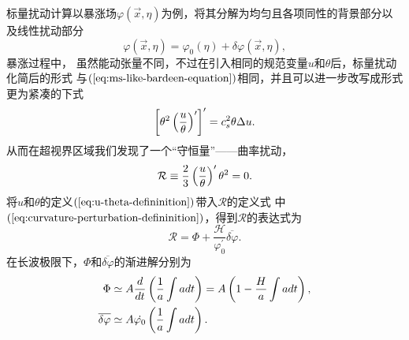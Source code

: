 标量扰动计算以暴涨场$\varphi(\vec{x},\eta)$为例，将其分解为均匀且各项同性的背景部分以及线性扰动部分
\begin{equation}
  \varphi(\vec{x},\eta)=\varphi_{0}(\eta)+\delta\varphi(\vec{x},\eta), 
\end{equation}
暴涨过程中，
虽然能动张量不同，不过在引入相同的规范变量$u$和$\theta$后，标量扰动化简后的形式
与$(\ref{eq:ms-like-bardeen-equation})$相同，并且可以进一步改写成形式更为紧凑的下式
\begin{equation}
  \left[\theta^2\left(\frac{u}{\theta}\right)^{\prime}\right]^{\prime} =
  c_{s}^2\theta\Delta u.
\end{equation}
从而在超视界区域我们发现了一个“守恒量”——曲率扰动，
\begin{equation}
  \label{eq:curvature-perturbation-defininition}
  \mathcal{R}\equiv \frac{2}{3}\left(\frac{u}{\theta}\right)^{\prime}\theta^2 = 0.
\end{equation}
将$u$和$\theta$的定义$(\ref{eq:u-theta-defininition})$带入$\mathcal{R}$的定义式
中$(\ref{eq:curvature-perturbation-defininition})$，得到$\mathcal{R}$的表达式为
\begin{equation}
  \mathcal{R} = \Phi +
  \frac{\mathcal{H}}{\varphi^{\prime}_0}\overline{\delta\varphi}.
\end{equation}
在长波极限下，$\Phi$和$\overline{\delta\varphi}$的渐进解分别为
\begin{align}
  \Phi &\simeq A\frac{d}{dt}\left(\frac{1}{a}\int a dt  \right) =
  A\left(1-\frac{H}{a}\int adt\right), \\
  \overline{\delta\varphi} &\simeq A \dot{\varphi_0}\left(\frac{1}{a}\int
  adt\right).
\end{align}
